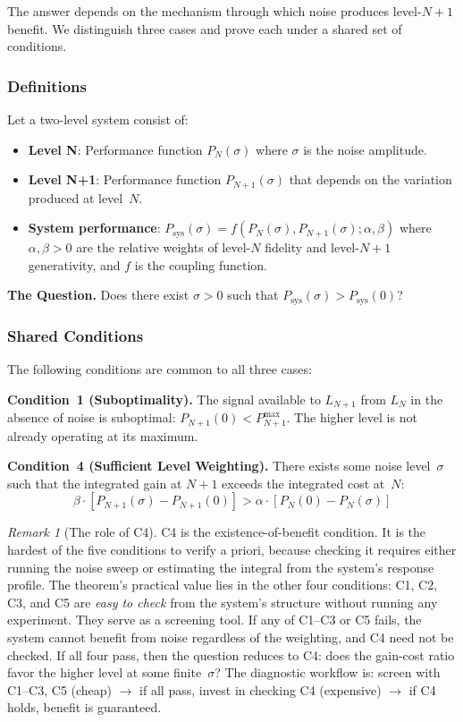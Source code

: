 \documentclass[12pt,letterpaper]{article}
\theoremstyle{definition}
\theoremstyle{remark}
\newtheorem{remark}[theorem]{Remark}
\newcommand{\Psys}{P_{\text{sys}}}
\newcommand{\Pn}{P_N}
\newcommand{\Pnp}{P_{N+1}}
\begin{document}
The answer depends on the mechanism through which noise produces level-$N{+}1$ benefit. We distinguish three cases and prove each under a shared set of conditions.

\subsubsection{Definitions}

Let a two-level system consist of:
\begin{itemize}
    \item \textbf{Level N}: Performance function $\Pn(\sigma)$ where $\sigma$ is the noise amplitude.
    \item \textbf{Level N+1}: Performance function $\Pnp(\sigma)$ that depends on the variation produced at level~$N$.
    \item \textbf{System performance}: $\Psys(\sigma) = f(\Pn(\sigma), \Pnp(\sigma); \alpha, \beta)$ where $\alpha, \beta > 0$ are the relative weights of level-$N$ fidelity and level-$N{+}1$ generativity, and $f$ is the coupling function.
\end{itemize}

\textbf{The Question.} Does there exist $\sigma > 0$ such that $\Psys(\sigma) > \Psys(0)$?

\subsubsection{Shared Conditions}

The following conditions are common to all three cases:

\medskip
\noindent\textbf{Condition~1 (Suboptimality).} The signal available to $L_{N+1}$ from $L_N$ in the absence of noise is suboptimal: $\Pnp(0) < P_{N+1}^{\max}$. The higher level is not already operating at its maximum.

\medskip
\noindent\textbf{Condition~4 (Sufficient Level Weighting).} There exists some noise level~$\sigma$ such that the integrated gain at $N{+}1$ exceeds the integrated cost at~$N$:
\begin{equation}
\beta \cdot [\Pnp(\sigma) - \Pnp(0)] > \alpha \cdot [\Pn(0) - \Pn(\sigma)]
\end{equation}

\begin{remark}[The role of C4]
\label{rem:C4role}
C4 is the existence-of-benefit condition. It is the hardest of the five conditions to verify a priori, because checking it requires either running the noise sweep or estimating the integral from the system's response profile. The theorem's practical value lies in the other four conditions: C1, C2, C3, and C5 are \emph{easy to check} from the system's structure without running any experiment. They serve as a screening tool. If any of C1--C3 or C5 fails, the system cannot benefit from noise regardless of the weighting, and C4 need not be checked. If all four pass, then the question reduces to C4: does the gain-cost ratio favor the higher level at some finite~$\sigma$? The diagnostic workflow is: screen with C1--C3, C5 (cheap) $\to$ if all pass, invest in checking C4 (expensive) $\to$ if C4 holds, benefit is guaranteed.
\end{remark}
\end{document}
